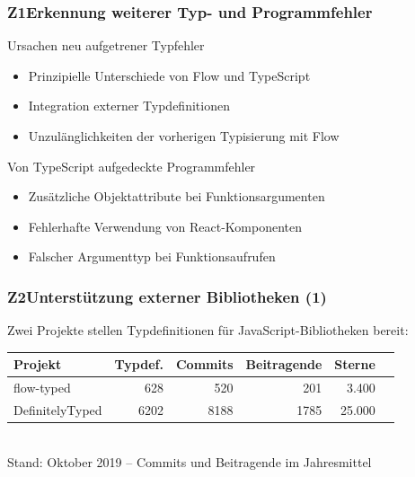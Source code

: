       \begin{frame}
        \frametitle{Z1\hspace{0.75em}Erkennung weiterer Typ- und Programmfehler}

        \begin{block}{Ursachen neu aufgetrener Typfehler}
          \begin{itemize}
            \item Prinzipielle Unterschiede von Flow und TypeScript
            \item Integration externer Typdefinitionen
            \item Unzulänglichkeiten der vorherigen Typisierung mit Flow
          \end{itemize}
        \end{block}
        \smallskip
        \begin{block}{Von TypeScript aufgedeckte Programmfehler}
          \begin{itemize}
            \item Zusätzliche Objektattribute bei Funktionsargumenten
            \item Fehlerhafte Verwendung von React-Komponenten
            \item Falscher Argumenttyp bei Funktionsaufrufen
          \end{itemize}
        \end{block}
      \end{frame}

      \begin{frame}
        \frametitle{Z2\hspace{0.75em}Unterstützung externer Bibliotheken (1)}
        Zwei Projekte stellen Typdefinitionen für JavaScript-Bibliotheken bereit:\\[1.5em]
        {
          \footnotesize
          \begin{tabu} to 
            \midrule
            \rowfont{\bfseries} Projekt & Typdef. & Commits & Beitragende & Sterne & {} \\
            \midrule
            flow-typed      &  628 &  520 &  201 &  3.400 & \autocite{FLOW_TYPED} \\
            DefinitelyTyped & 6202 & 8188 & 1785 & 25.000 & \autocite{DEFINITELY_TYPED} \\
            \midrule
          \end{tabu}
          \\[1em]
          Stand: Oktober 2019 -- Commits und Beitragende im Jahresmittel
        }
      \end{frame}

